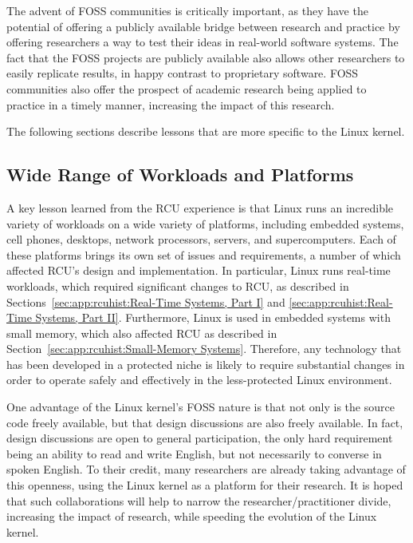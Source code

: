 The advent of FOSS communities is critically important, as they have
the potential of offering a publicly available bridge between research
and practice by offering researchers a way to test their ideas in
real-world software systems.
The fact that the FOSS projects are publicly available also allows
other researchers to easily replicate results, in happy contrast to
proprietary software.
FOSS communities also offer the prospect of academic research being
applied to practice in a timely manner, increasing the impact of
this research.

The following sections describe lessons that are more
specific to the Linux kernel.

\subsection{Wide Range of Workloads and Platforms}
\label{sec:app:rcuhist:Wide Range of Workloads and Platforms}

A key lesson learned from the RCU experience is that Linux runs
an incredible variety of workloads on a wide variety of platforms,
including embedded systems, cell phones, desktops, network processors,
servers, and supercomputers.
Each of these platforms brings its own set of issues and requirements,
a number of which affected RCU's design and implementation.
In particular, Linux runs real-time workloads, which required significant
changes to RCU, as described in
Sections~\ref{sec:app:rcuhist:Real-Time Systems, Part I} and
\ref{sec:app:rcuhist:Real-Time Systems, Part II}.
Furthermore, Linux is used in embedded systems with small memory,
which also affected RCU as described in Section~\ref{sec:app:rcuhist:Small-Memory Systems}.
Therefore, any technology that has been developed in a protected niche
is likely to require substantial changes in order to operate safely
and effectively in the less-protected Linux environment.

One advantage of the Linux kernel's FOSS nature is that not only
is the source code freely available, but that design discussions are also
freely available.
In fact, design discussions are open to general participation, the only
hard requirement being an ability to read and write English, 
but not necessarily to converse in spoken English.
To their credit, many researchers are already taking advantage of
this openness, using the Linux kernel as a platform for their research.
It is hoped that such collaborations will help to narrow the
researcher/practitioner divide, increasing the impact of research,
while speeding the evolution of the Linux kernel.

